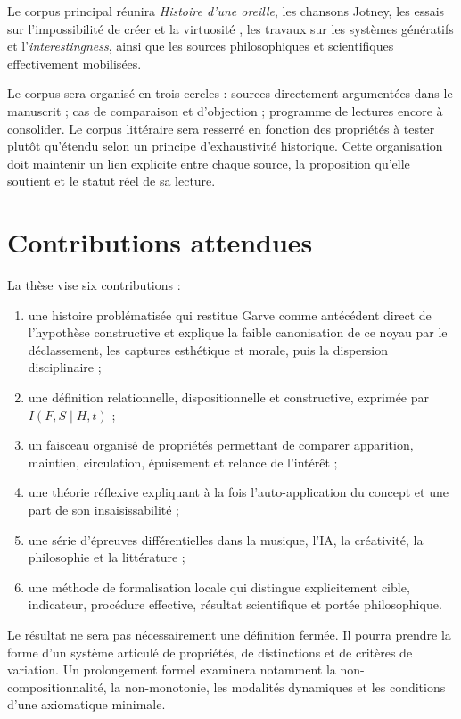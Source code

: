 \documentclass[11pt,a4paper]{article}
\begin{document}
Le corpus principal réunira \emph{Histoire d'une oreille}, les chansons Jotney,
les essais sur l'impossibilité de créer et la virtuosité
\parencite{pachet2018oreille,pachet2026impossibilite,pachet2027virtuosite}, les
travaux sur les systèmes génératifs et l'\emph{interestingness}, ainsi que les
sources philosophiques et scientifiques effectivement mobilisées.

Le corpus sera organisé en trois cercles : sources directement argumentées dans
le manuscrit ; cas de comparaison et d'objection ; programme de lectures encore
à consolider. Le corpus littéraire sera resserré en fonction des propriétés à
tester plutôt qu'étendu selon un principe d'exhaustivité historique. Cette
organisation doit maintenir un lien explicite entre chaque source, la
proposition qu'elle soutient et le statut réel de sa lecture.

\section{Contributions attendues}

La thèse vise six contributions :

\begin{enumerate}
  \item une histoire problématisée qui restitue Garve comme antécédent direct de
        l'hypothèse constructive et explique la faible canonisation de ce noyau
        par le déclassement, les captures esthétique et morale, puis la dispersion
        disciplinaire ;
  \item une définition relationnelle, dispositionnelle et constructive,
        exprimée par \(I(F,S\mid H,t)\) ;
  \item un faisceau organisé de propriétés permettant de comparer apparition,
        maintien, circulation, épuisement et relance de l'intérêt ;
  \item une théorie réflexive expliquant à la fois l'auto-application du concept
        et une part de son insaisissabilité ;
  \item une série d'épreuves différentielles dans la musique, l'IA, la
        créativité, la philosophie et la littérature ;
  \item une méthode de formalisation locale qui distingue explicitement cible,
        indicateur, procédure effective, résultat scientifique et portée
        philosophique.
\end{enumerate}

Le résultat ne sera pas nécessairement une définition fermée. Il pourra prendre
la forme d'un système articulé de propriétés, de distinctions et de critères de
variation. Un prolongement formel examinera notamment la
non-compositionnalité, la non-monotonie, les modalités dynamiques et les
conditions d'une axiomatique minimale.
\end{document}
